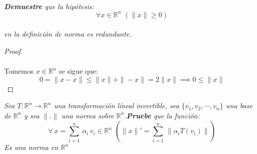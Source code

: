 \documentclass[11pt,letterpaper]{article}
\newcommand{\R}{\mathbb{R}}
\begin{document}
\,\\
\begin{tcolorbox}[
	title = \textcolor{black}{\textcolor{white}{Problema 1}}]
\textit{\textbf{Demuestre} que la hip\'otesis:\,\\
\begin{equation*}
    \forall x\in \R^n\,\,(\|x\|\geq 0)
\end{equation*}\,\\
en la definici\'on de norma es redundante.
}
\end{tcolorbox}
\begin{proof}\,\\
    \,\\
    Tomemos $x\in \R^n$ se sigue que:\,\\
    \begin{equation*}
        0=\|x-x\| \leq\|x\|+\|-x\|=2\|x\| \implies 0\leq \|x\|
    \end{equation*}
\end{proof}
\begin{tcolorbox}[
	title = \textcolor{black}{\textcolor{white}{Problema 2}}]
\textit{Sea $T:\R^n\rightarrow \R^n$ una transformaci\'on l\'ineal invertible, sea $\{v_1,v_2,\cdots,v_n\}$ una base de
$\R^n$ y sea $\parallel.\parallel$ una norma sobre $\R^n$.\textbf{Pruebe} que la funci\'on:\,\\
\begin{equation*}
    \forall\,x=\sum_{i=1}^n\,\alpha_i\,v_i \in \R^n\,\,\left(\|x\|' =\sum_{i=1}^n\,\|\alpha_i T(v_i)\|\right)
\end{equation*}
Es una norma en $\R^n$
}
\end{tcolorbox}\,\\
\end{document}
